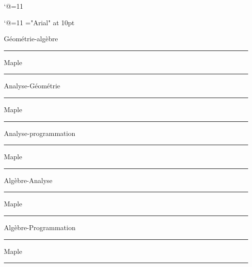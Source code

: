 \catcode`@=11\relax
\def\Api{Mathematicon@Api}%






\catcode`@=11\relax
\font\LD@Font@Arial="Arial" at 10pt


\LD@Exo@Label@Show
\vglue-10mm
\bigskip



\vfill




\centerline{\seventeenbf  G\'eom\'etrie-alg\`ebre}
\hrule
\medskip
{}
\medskip
\centerline{\twelvebf Maple}
\medskip
{}
\medskip
\hrule
\medskip
\vfill


\centerline{\seventeenbf  Analyse-G\'eom\'etrie}
\hrule
\medskip
{}
\medskip
\centerline{\twelvebf Maple}
\medskip
{}
\medskip
\hrule
\medskip
\vfill


\centerline{\seventeenbf  Analyse-programmation}
\hrule
\medskip
{}
\medskip
\centerline{\twelvebf Maple}
\medskip
{}
\medskip
\hrule
\vfill\null
\goodbreak
\null\vfill



\centerline{\seventeenbf  Alg\`ebre-Analyse}
\hrule

\medskip
\centerline{\twelvebf Maple}
\medskip
{}
\medskip
\hrule
\bigskip
\vfill



\centerline{\seventeenbf  Alg\`ebre-Programmation}
\hrule
\medskip
{}
\medskip
\centerline{\twelvebf Maple}
\medskip
{}
\medskip
\hrule
\vfill





